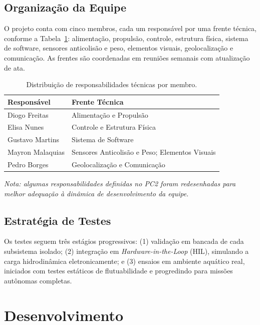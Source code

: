 \documentclass[12pt,a4paper]{article}
\begin{document}
\subsection{Organização da Equipe}

O projeto conta com cinco membros, cada um responsável por uma frente técnica, conforme a Tabela~\ref {tab:responsabilidades}: alimentação, propulsão, controle, estrutura física, sistema de software, sensores anticolisão e peso, elementos visuais, geolocalização e comunicação. As frentes são coordenadas em reuniões semanais com atualização de ata.

\begin{table}[H]
\centering
\begin{tabular}{|l|l|}
\hline
\textbf{Responsável} & \textbf{Frente Técnica} \\ \hline
Diogo Freitas    & Alimentação e Propulsão \\ \hline
Elisa Nunes      & Controle e Estrutura Física \\ \hline
Gustavo Martins  & Sistema de Software \\ \hline
Mayron Malaquias & Sensores Anticolisão e Peso; Elementos Visuais \\ \hline
Pedro Borges     & Geolocalização e Comunicação \\ \hline
\end{tabular}
\caption{Distribuição de responsabilidades técnicas por membro.}
\label{tab:responsabilidades}
\end{table}

\vspace{0.3em}
{\footnotesize \textit{Nota: algumas responsabilidades definidas no PC2 foram redesenhadas para melhor adequação à dinâmica de desenvolvimento da equipe.}}

\subsection{Estratégia de Testes}

Os testes seguem três estágios progressivos: (1) validação em bancada de cada subsistema isolado; (2) integração em \textit{Hardware-in-the-Loop} (HIL), simulando a carga hidrodinâmica eletronicamente; e (3) ensaios em ambiente aquático real, iniciados com testes estáticos de flutuabilidade e progredindo para missões autônomas completas.

\section{Desenvolvimento}
\end{document}
